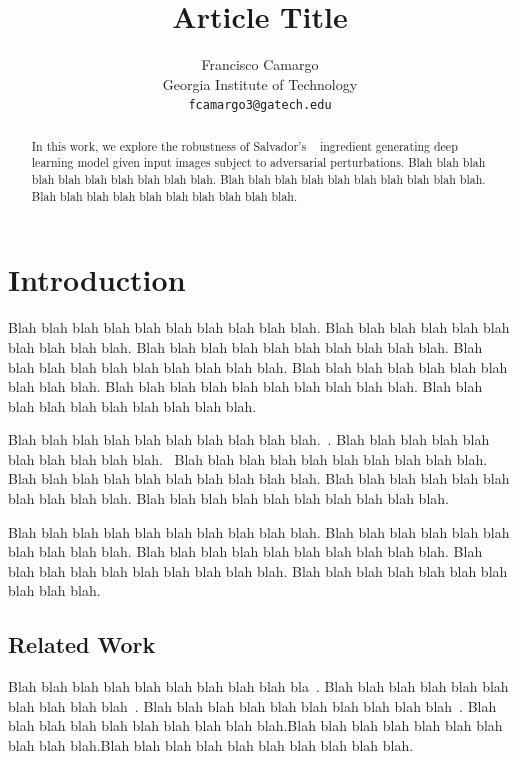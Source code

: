 \documentclass[10pt,twocolumn,letterpaper]{article}
\begin{document}
\title{\vspace{-2.0cm}Article Title}

\author{Francisco Camargo\\
Georgia Institute of Technology\\
{\tt\small fcamargo3@gatech.edu}
}

\maketitle

\begin{abstract}
    In this work, we explore the robustness of Salvador's \etal~\cite{2019fb, fb_github} ingredient generating deep learning model given input images subject to adversarial perturbations. Blah blah blah blah blah blah blah blah blah blah. Blah blah blah blah blah blah blah blah blah blah. Blah blah blah blah blah blah blah blah blah blah.
\end{abstract}

\section{Introduction}
Blah blah blah blah blah blah blah blah blah blah. Blah blah blah blah blah blah blah blah blah blah. Blah blah blah blah blah blah blah blah blah blah. Blah blah blah blah blah blah blah blah blah blah. Blah blah blah blah blah blah blah blah blah blah. Blah blah blah blah blah blah blah blah blah blah. Blah blah blah blah blah blah blah blah blah blah.

Blah blah blah blah blah blah blah blah blah blah.~\cite{BossardFood101, salvador2017learning, 2019fb}. Blah blah blah blah blah blah blah blah blah blah.~\cite{2019fb} Blah blah blah blah blah blah blah blah blah blah. Blah blah blah blah blah blah blah blah blah blah. Blah blah blah blah blah blah blah blah blah blah. Blah blah blah blah blah blah blah blah blah blah.

Blah blah blah blah blah blah blah blah blah blah. Blah blah blah blah blah blah blah blah blah blah. Blah blah blah blah blah blah blah blah blah blah. Blah blah blah blah blah blah blah blah blah blah. Blah blah blah blah blah blah blah blah blah blah.

\subsection{Related Work}
Blah blah blah blah blah blah blah blah blah bla~\cite{BossardFood101}. Blah blah blah blah blah blah blah blah blah blah~\cite{salvador2017learning}. Blah blah blah blah blah blah blah blah blah blah~\cite{marin2019learning}. Blah blah blah blah blah blah blah blah blah blah.Blah blah blah blah blah blah blah blah blah blah.Blah blah blah blah blah blah blah blah blah blah.
\end{document}
